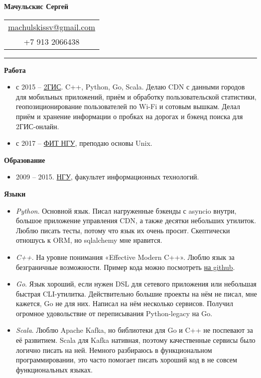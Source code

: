 \documentclass[final]{letter}
\begin{document}
\begin{center}

{\fontsize{25}{40}\selectfont\bf{Мачульскис Сергей}}
  {\hfill
    \begin{tabular}{c}
        \href{mailto:machulskissv@gmail.com}{machulskissv@gmail.com}\\
        +7 913 2066438\\
     \end{tabular}
  }
\rule{.98\textwidth}{1pt}

\addvspace{.1cm}

\end{center}

{\bf Работа}
\begin{itemize}
\item с 2015 -- \href{https://2gis.com}{2ГИС}. C++, Python, Go, Scala. Делаю CDN с данными городов для мобильных приложений, приём и обработку пользовательской статистики, геопозиционирование пользователей по Wi-Fi и сотовым вышкам. Делал приём и хранение информации о пробках на дорогах и бэкенд поиска для 2ГИС-онлайн.
\item с 2017 -- \href{http://fit.nsu.ru/}{ФИТ НГУ}, преподаю основы Unix.
\end{itemize}

{\bf Образование}
\begin{itemize}
\item 2009 -- 2015. \href{https://www.nsu.ru/n/}{НГУ}, факультет информационных технологий.
\end{itemize}

{\bf Языки}
\begin{itemize}
\item \textit{Python}. Основной язык. Писал нагруженные бэкенды с asyncio внутри, большое приложение управления CDN, а также десятки небольших утилиток. Люблю писать тесты, потому что язык их очень просит. Скептически отношусь к ORM, но sqlalchemy мне нравится.
\item \textit{C++}. На уровне понимания «Effective Modern C++». Люблю язык за безграничные возможности. Пример кода можно посмотреть \href{https://github.com/neexee/review}{на github}.
\item \textit{Go}. Язык хороший, если нужен DSL для сетевого приложения или небольшая быстрая CLI-утилитка. Действительно большие проекты на нём не писал, мне кажется, Go не для них. Написал на нём несколько сервисов. Получил огромное удовольствие от переписывания Python-legacy на Go.
\item \textit{Scala}. Люблю Apache Kafka, но библиотеки для Go и C++ не поспевают за её развитием. Scala для Kafka нативная, поэтому качественные сервисы было логично писать на ней. Немного разбираюсь в функциональном программировании, это часто помогает писать хороший код в не совсем функциональных языках.
\end{itemize}
\end{document}
